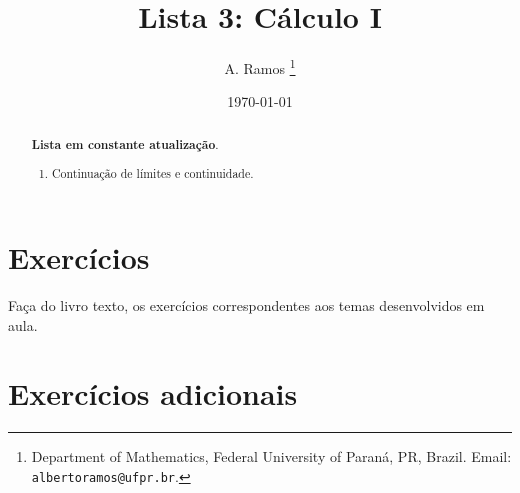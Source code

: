 \documentclass[latin,20pt]{article}
\begin{document}
\title{Lista 3: Cálculo I }
 
\author{
A. Ramos \thanks{Department of Mathematics,
    Federal University of Paraná, PR, Brazil.
    Email: {\tt albertoramos@ufpr.br}.}
}

\date{\today}
 
\maketitle

\begin{abstract}
{\bf Lista em constante atualização}.
 \begin{enumerate}
 \item Continuação de límites e continuidade. 
 \end{enumerate}
\end{abstract}

 
  \section{Exercícios}   
 
 Faça do livro texto, os exercícios correspondentes aos temas desenvolvidos em aula. 
  
  \section{Exercícios adicionais} 
\end{document}
